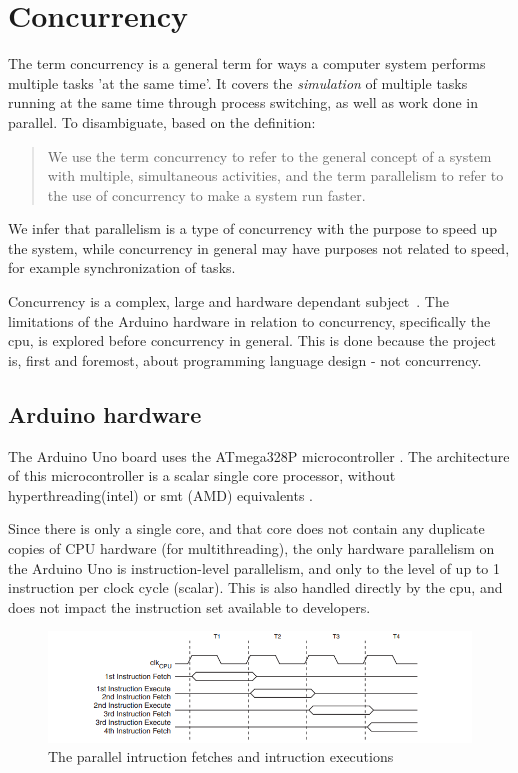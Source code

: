 \section{Concurrency}\label{sec:concurrency}
The term concurrency is a general term for ways a computer system performs multiple tasks 'at the same time'. It covers the \textit{simulation} of multiple tasks running at the same time through process switching, as well as work done in parallel. To disambiguate, based on the definition:

\blockcquote{Bryant2016}{We use the term concurrency to refer to the general concept of a system with multiple, simultaneous activities, and the term parallelism to refer to the use of concurrency to make a system run faster.}

We infer that parallelism is a type of concurrency with the purpose to speed up the system, while concurrency in general may have purposes not related to speed, for example synchronization of tasks.

Concurrency is a complex, large and hardware dependant subject~\cite{Sebesta2016}. The limitations of the Arduino hardware in relation to concurrency, specifically the \gls{cpu}, is explored before concurrency in general. This is done because the project is, first and foremost, about programming language design - not concurrency.

\subsection{Arduino hardware}\label{subsec:arduinohardware}
The Arduino Uno board uses the ATmega328P microcontroller \cite{ArduinoUno}. The architecture of this microcontroller is a scalar single core processor, without hyperthreading(intel) or \gls{smt} (AMD) equivalents \cite{ATmega328P}.

Since there is only a single core, and that core does not contain any duplicate copies of CPU hardware (for multithreading), the only hardware parallelism on the Arduino Uno is instruction-level parallelism, and only to the level of up to 1 instruction per clock cycle (scalar). This is also handled directly by the \gls{cpu}, and does not impact the instruction set available to developers.


\begin{figure}[htb!]
    \centering
    \includegraphics[width=\textwidth]{figures/Arduino_Pipeline.png}
    \caption{The parallel intruction fetches and intruction executions \cite{ATmega328P}}
    \label{fig:arduinopipeline}
\end{figure}


